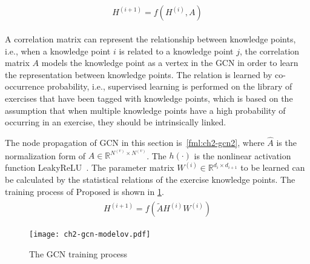 \begin{align}
	\begin{split}
		H^{(i+1)}=f(H^{(i)},A) \label{fml:ch2-gcnlayer}
	\end{split}
\end{align}


A correlation matrix can represent the relationship between knowledge points, i.e., when a knowledge point \(i\) is related to a knowledge point \(j\), the correlation matrix \(A\) models the knowledge point as a vertex in the GCN in order to learn the representation between knowledge points. The relation is learned by co-occurrence probability, i.e., supervised learning is performed on the library of exercises that have been tagged with knowledge points, which is based on the assumption that when multiple knowledge points have a high probability of occurring in an exercise, they should be intrinsically linked.


The node propagation of GCN in this section is~\ref{fml:ch2-gcn2}, where \(\widehat{A}\) is the normalization form of \(A\in \mathbb{R}^{N^{(v)}\times N^{(v)}}\). The \(h(\cdot)\) is the nonlinear activation function LeakyReLU~\cite{maas2013rectifier}. The parameter matrix \(W^{(i)}\in \mathbb{R}^{d_{i}\times d_{i+1}}\) to be learned can be calculated by the statistical relations of the exercise knowledge points. The training process of Proposed is shown in \figurename{\ref{fig:ch2-gcn-explain}}.
\begin{align}
	\begin{split}
		H^{(i+1)} = f(\tilde{A}H^{(i)}W^{(i)})\label{fml:ch2-gcn2}
	\end{split}
\end{align}

\begin{figure}[htbp!]
	\centering
	\texttt{[image: ch2-gcn-modelov.pdf]}
	\caption{The GCN training process}\label{fig:ch2-gcn-explain}
\end{figure}

